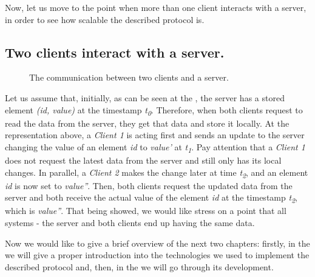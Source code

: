 Now, let us move to the point when more than one client interacts with a server, in order to see how scalable the described protocol is.

\subsection*{Two clients interact with a server.}

\begin{figure}[!htb]
    \begin{center}
    \def\svgwidth{\linewidth}
    
    \caption {The communication between two clients and a server.}
    \label{fig:design5}
\end{center}
\end{figure}

Let us assume that, initially, as can be seen at the , the server has a stored element \textit{(id, value)} at the timestamp \textit{t\textsubscript{0}}. Therefore, when both clients request to read the data from the server, they get that data and store it locally. At the representation above, a \textit{Client 1} is acting first and sends an update to the server changing the value of an element \textit{id} to \textit{value'} at \textit{t\textsubscript{1}}. Pay attention that a \textit{Client 1} does not request the latest data from the server and still only has its local changes. In parallel, a \textit{Client 2} makes the change later at time \textit{t\textsubscript{2}}, and an element \textit{id} is now set to \textit{value''}. Then, both clients request the updated data from the server and both receive the actual value of the element \textit{id} at the timestamp \textit{t\textsubscript{2}}, which is \textit{value''}. That being showed, we would like stress on a point that all systems - the server and both clients end up having the same data.

Now we would like to give a brief overview of the next two chapters: firstly, in the  we will give a proper introduction into the technologies we used to implement the described protocol and, then, in the  we will go through its development.